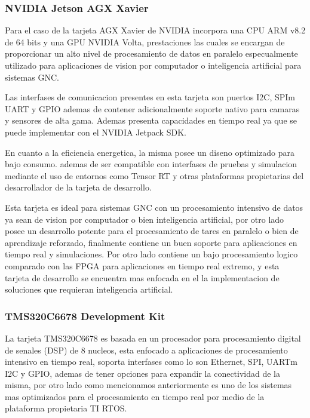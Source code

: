 \subsubsection{NVIDIA Jetson AGX Xavier}

Para el caso de la tarjeta AGX Xavier de NVIDIA incorpora una CPU ARM v8.2 de 64 bits y una GPU NVIDIA Volta, prestaciones las cuales se encargan de proporcionar
un alto nivel de procesamiento de datos en paralelo especualmente utilizado para aplicaciones de vision por computador o inteligencia artificial para sistemas GNC. 

Las interfases de comunicacion presentes en esta tarjeta son puertos I2C, SPIm UART y GPIO ademas de contener adicionalmente soporte nativo para camaras y sensores de
alta gama. Ademas presenta capacidades en tiempo real ya que se puede implementar con el NVIDIA Jetpack SDK. 

En cuanto a la eficiencia energetica, la misma posee un diseno optimizado para bajo consumo. ademas de ser compatible con interfases de pruebas y simulacion mediante el 
uso de entornos como Tensor RT y otras plataformas propietarias del desarrollador de la tarjeta de desarrollo.

Esta tarjeta es ideal para sistemas GNC con un procesamiento intensivo de datos ya sean de vision por computador o bien inteligencia artificial, por otro lado posee un desarrollo potente 
para el procesamiento de tares en paralelo o bien de aprendizaje reforzado, finalmente contiene un buen soporte para aplicaciones en tiempo real y simulaciones. Por otro lado contiene un 
bajo procesamiento logico comparado con las FPGA para aplicaciones en tiempo real extremo, y esta tarjeta de desarrollo se encuentra mas enfocada en el la implementacion de soluciones que
requieran inteligencia artificial.

\subsubsection{TMS320C6678 Development Kit}

La tarjeta TMS320C6678 es basada en un procesador para procesamiento digital de senales (DSP) de 8 nucleos, esta enfocado a aplicaciones de procesamiento intensivo en tiempo real, soporta
interfases como lo son Ethernet, SPI, UARTm I2C y GPIO, ademas de tener opciones para expandir la conectividad de la misma, por otro lado como mencionamos anteriormente es uno de los sistemas
mas optimizados para el procesamiento en tiempo real por medio de la plataforma propietaria TI RTOS.

